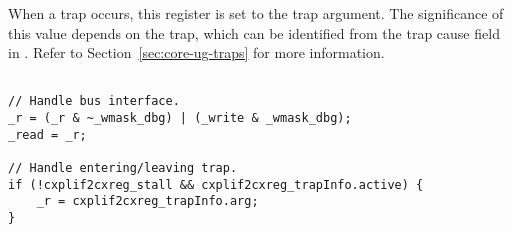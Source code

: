 When a trap occurs, this register is set to the trap argument. The significance
of this value depends on the trap, which can be identified from the trap cause
field in . Refer to Section~\ref{sec:core-ug-traps} for more
information.

\declaration{}
\implementation{}
\begin{lstlisting}

// Handle bus interface.
_r = (_r & ~_wmask_dbg) | (_write & _wmask_dbg);
_read = _r;

// Handle entering/leaving trap.
if (!cxplif2cxreg_stall && cxplif2cxreg_trapInfo.active) {
    _r = cxplif2cxreg_trapInfo.arg;
}

\end{lstlisting}

